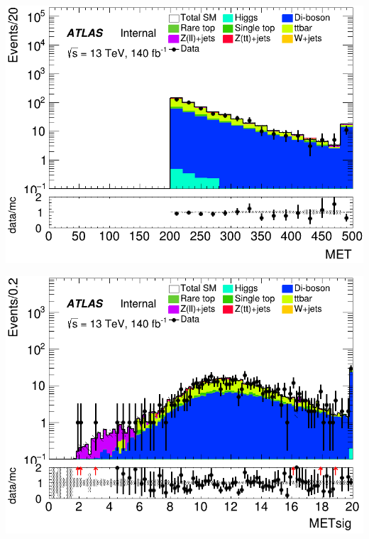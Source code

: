 \documentclass[usenames,dvipsnames]{beamer}
\begin{document}
\begin{frame}
    \vspace{0.5cm} %

    \begin{minipage}{0.32\textwidth}
        \centering
        \includegraphics[width=\textwidth]{graphics/LLH_met/LLH_met_MET.png}
    \end{minipage}
    \hfill
    \begin{minipage}{0.32\textwidth}
        \centering
        \includegraphics[width=\textwidth]{graphics/LLH_met/LLH_met_METsig.png}
    \end{minipage}
    \hfill
    

\end{frame}
\end{document}
